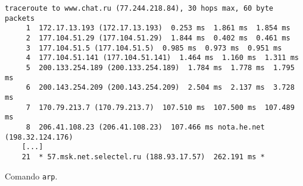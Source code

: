 \begin{parts}
\begin{subparts}
\begin{solution}
    \begin{Verbatim}[label={\$ traceroute www.cs.ubc.ca}, fontsize=\footnotesize]
    traceroute to www.chat.ru (77.244.218.84), 30 hops max, 60 byte packets
     1  172.17.13.193 (172.17.13.193)  0.253 ms  1.861 ms  1.854 ms
     2  177.104.51.29 (177.104.51.29)  1.844 ms  0.402 ms  0.461 ms
     3  177.104.51.5 (177.104.51.5)  0.985 ms  0.973 ms  0.951 ms
     4  177.104.51.141 (177.104.51.141)  1.464 ms  1.160 ms  1.311 ms
     5  200.133.254.189 (200.133.254.189)  1.784 ms  1.778 ms  1.795 ms
     6  200.143.254.209 (200.143.254.209)  2.504 ms  2.137 ms  3.728 ms
     7  170.79.213.7 (170.79.213.7)  107.510 ms  107.500 ms  107.489 ms
     8  206.41.108.23 (206.41.108.23)  107.466 ms nota.he.net (198.32.124.176)
    [...]
    21  * 57.msk.net.selectel.ru (188.93.17.57)  262.191 ms *
    \end{Verbatim}
    \end{solution}
  \end{subparts}
\end{parts}

\question
Comando \verb|arp|.

